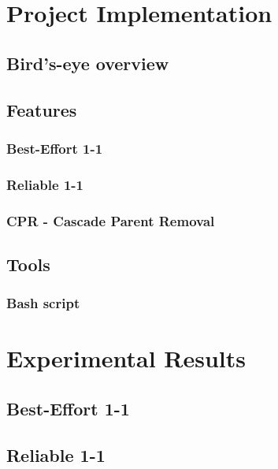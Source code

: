 \documentclass{article}
\begin{document}
\clearpage

\section{Project Implementation}
\subsection{Bird's-eye overview}
\subsection{Features}
\subsubsection{Best-Effort 1-1}
\subsubsection{Reliable 1-1}
\subsubsection{CPR - Cascade Parent Removal}
\subsection{Tools}
\subsubsection{Bash script}
\label{sec:bash}
\clearpage

\section{Experimental Results}
\subsection{Best-Effort 1-1}
\subsection{Reliable 1-1}
\end{document}
